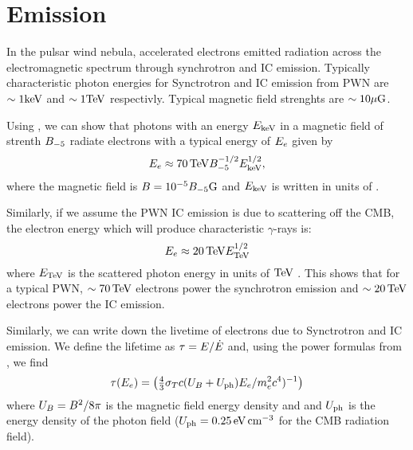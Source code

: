 \section{ Emission}

In the pulsar wind nebula, accelerated electrons emitted radiation across
the electromagnetic spectrum through synchrotron and \ac{IC} emission.
Typically characteristic photon energies for Synctrotron and \ac{IC}
emission from \ac{PWN} are $\sim1\text{keV}$ and $\sim1\text{TeV}$ respectivly.
Typical magnetic field strenghts are $\sim10\mu\text{G}$.

Using , we can show that
photons with an energy $E_\text{keV}$ in a magnetic field of strenth
$B_{-5}$ radiate electrons with a typical energy of
$E_e$ given by
\begin{equation}
  E_e \approx  70\,\text{TeV} B_{-5}^{-1/2} E_\text{keV}^{1/2},
\end{equation}
where the magnetic field is $B=10^{-5}
B_{-5}\text{G}$ and $E_\text{keV}$ is written in units of \kev
\citep{de-jager_2009a_implications-observations}.  

Similarly, if we assume the \ac{PWN} \ac{IC} emission
is due to scattering off the \ac{CMB},
the electron energy which will produce characteristic
\tev $\gamma$-rays is:
\begin{equation}
  E_e \approx 20\,\text{TeV} E_\text{TeV}^{1/2}
\end{equation}
where $E_\text{TeV}$ is the scattered photon energy in units
of $\text{TeV}$ \citep{de-jager_2009a_implications-observations}.  
This shows that for a typical \ac{PWN}, $\sim70\,\text{TeV}$ electrons
power the synchrotron emission and $\sim20\,\text{TeV}$ electrons
power the \ac{IC} emission.

Similarly, we can write down the livetime of electrons
due to Synctrotron and \ac{IC} emission. We define the lifetime as
$\tau = E/\dot{E}$ and, using the power formulas from
\cite{rybicki_1979a_radiative-processes}, we find
\begin{equation}
  \tau(E_e) = 
  \left(
  \tfrac{4}{3} \sigma_T c (U_B + U_\text{ph}) 
  E_e/ m_e^2c^4)^{-1}
  \right)
\end{equation}
where $U_B = B^2/8\pi$
is the magnetic field energy density and and
$U_\text{ph}$ is the energy density of the photon field
($U_\text{ph}=0.25\,\text{eV}\,\text{cm}^{-3}$ for the
\ac{CMB} radiation field).

